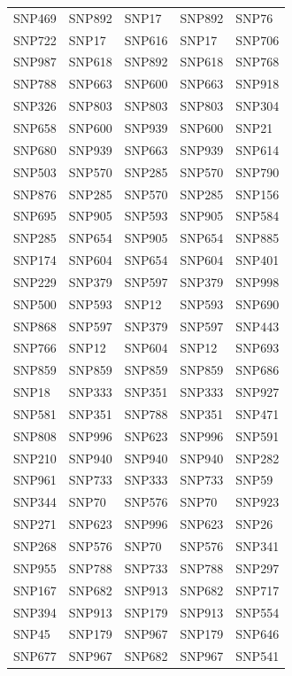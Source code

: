 \begin{table}[ht]
\begin{tabular}{lllll}
  SNP469 & SNP892 & SNP17 & SNP892 & SNP76 \\ 
  SNP722 & SNP17 & SNP616 & SNP17 & SNP706 \\ 
  SNP987 & SNP618 & SNP892 & SNP618 & SNP768 \\ 
  SNP788 & SNP663 & SNP600 & SNP663 & SNP918 \\ 
  SNP326 & SNP803 & SNP803 & SNP803 & SNP304 \\ 
  SNP658 & SNP600 & SNP939 & SNP600 & SNP21 \\ 
  SNP680 & SNP939 & SNP663 & SNP939 & SNP614 \\ 
  SNP503 & SNP570 & SNP285 & SNP570 & SNP790 \\ 
  SNP876 & SNP285 & SNP570 & SNP285 & SNP156 \\ 
  SNP695 & SNP905 & SNP593 & SNP905 & SNP584 \\ 
  SNP285 & SNP654 & SNP905 & SNP654 & SNP885 \\ 
  SNP174 & SNP604 & SNP654 & SNP604 & SNP401 \\ 
  SNP229 & SNP379 & SNP597 & SNP379 & SNP998 \\ 
  SNP500 & SNP593 & SNP12 & SNP593 & SNP690 \\ 
  SNP868 & SNP597 & SNP379 & SNP597 & SNP443 \\ 
  SNP766 & SNP12 & SNP604 & SNP12 & SNP693 \\ 
  SNP859 & SNP859 & SNP859 & SNP859 & SNP686 \\ 
  SNP18 & SNP333 & SNP351 & SNP333 & SNP927 \\ 
  SNP581 & SNP351 & SNP788 & SNP351 & SNP471 \\ 
  SNP808 & SNP996 & SNP623 & SNP996 & SNP591 \\ 
  SNP210 & SNP940 & SNP940 & SNP940 & SNP282 \\ 
  SNP961 & SNP733 & SNP333 & SNP733 & SNP59 \\ 
  SNP344 & SNP70 & SNP576 & SNP70 & SNP923 \\ 
  SNP271 & SNP623 & SNP996 & SNP623 & SNP26 \\ 
  SNP268 & SNP576 & SNP70 & SNP576 & SNP341 \\ 
  SNP955 & SNP788 & SNP733 & SNP788 & SNP297 \\ 
  SNP167 & SNP682 & SNP913 & SNP682 & SNP717 \\ 
  SNP394 & SNP913 & SNP179 & SNP913 & SNP554 \\ 
  SNP45 & SNP179 & SNP967 & SNP179 & SNP646 \\ 
  SNP677 & SNP967 & SNP682 & SNP967 & SNP541 \\ 

\end{tabular}
\end{table}
